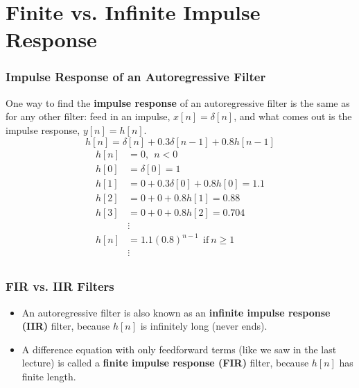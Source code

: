 \documentclass{beamer}
\begin{document}
\section[FIR and IIR]{Finite vs. Infinite Impulse Response}
\setcounter{subsection}{1}

\begin{frame}
  \frametitle{Impulse Response of an Autoregressive Filter}

  One way to find the {\bf impulse response} of an autoregressive
  filter is the same as for any other filter: feed in an impulse,
  $x[n]=\delta[n]$, and what comes out is the impulse response,
  $y[n]=h[n]$.
  \[
  h[n] = \delta[n] + 0.3\delta[n-1] + 0.8 h[n-1]
  \]
  \begin{align*}
    h[n] &= 0,~~n<0\\
    h[0] &= \delta[0] = 1\\
    h[1] &= 0 + 0.3\delta[0] + 0.8 h[0] = 1.1\\
    h[2] &= 0 + 0 + 0.8 h[1] = 0.88\\
    h[3] &= 0+ 0 + 0.8 h[2] = 0.704\\
    & \vdots\\
    h[n] &= 1.1(0.8)^{n-1}~~\mbox{if}~n\ge 1\\
    & \vdots\\
  \end{align*}
\end{frame}

\begin{frame}
  \frametitle{FIR vs. IIR Filters}

  \begin{itemize}
  \item An autoregressive filter is also known as an {\bf infinite
    impulse response (IIR)} filter, because $h[n]$ is infinitely long
    (never ends).
  \item A difference equation with only feedforward terms (like we saw
    in the last lecture) is called a {\bf finite impulse response
      (FIR)} filter, because $h[n]$ has finite length.
  \end{itemize}
\end{frame}
\end{document}
